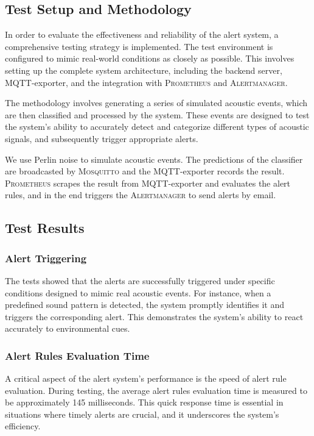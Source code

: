 \subsection{Test Setup and Methodology}
In order to evaluate the effectiveness and reliability of the alert system, a comprehensive testing strategy is implemented. The test environment is configured to mimic real-world conditions as closely as possible. This involves setting up the complete system architecture, including the backend server, MQTT-exporter, and the integration with \textsc{Prometheus} and \textsc{Alertmanager}.

The methodology involves generating a series of simulated acoustic events, which are then classified and processed by the system. These events are designed to test the system's ability to accurately detect and categorize different types of acoustic signals, and subsequently trigger appropriate alerts.

We use Perlin noise to simulate acoustic events. The predictions of the classifier are broadcasted by \textsc{Mosquitto} and the MQTT-exporter records the result. \textsc{Prometheus} scrapes the result from MQTT-exporter and evaluates the alert rules, and in the end triggers the \textsc{Alertmanager} to send alerts by email.

\subsection{Test Results}
\subsubsection{Alert Triggering}
The tests showed that the alerts are successfully triggered under specific conditions designed to mimic real acoustic events. For instance, when a predefined sound pattern is detected, the system promptly identifies it and triggers the corresponding alert. This demonstrates the system's ability to react accurately to environmental cues.

\subsubsection{Alert Rules Evaluation Time}

A critical aspect of the alert system's performance is the speed of alert rule evaluation. During testing, the average alert rules evaluation time is measured to be approximately 145 milliseconds. This quick response time is essential in situations where timely alerts are crucial, and it underscores the system's efficiency.

